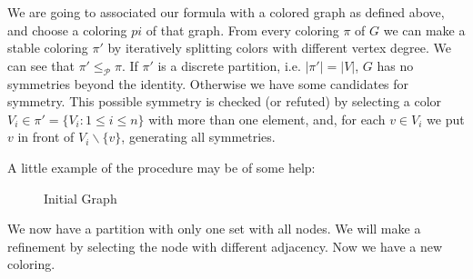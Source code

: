 We are going to associated our formula with a colored graph as defined above, and choose a coloring $pi$ of that graph. From every coloring $\pi$ of $G$ we can make a stable coloring $\pi'$ by iteratively splitting colors with different vertex degree. We can see that $\pi' \le_\mathcal{P} \pi$. If $\pi'$ is a discrete partition, i.e. $|\pi'| = |V|$,  $G$ has no symmetries beyond the identity. Otherwise we have some candidates for symmetry. This possible symmetry is checked (or refuted) by selecting a color $V_i\in \pi' = \{V_i : 1 \le i \le n\}$ with more than one element, and, for each $v\in V_i$ we put $v$ in front of $V_i \backslash \{v\}$, generating all symmetries.

\begin{example}

A little example of the procedure may be of some help:
\begin{figure}[H]
  \centering
  
  
  \caption{Initial Graph}
\end{figure}

 We now have a partition with only one set with all nodes. We will make a refinement by selecting the node with different adjacency. Now we have a new coloring.



\begin{figure}[H]
  \centering
  
\end{figure}
\end{example}
